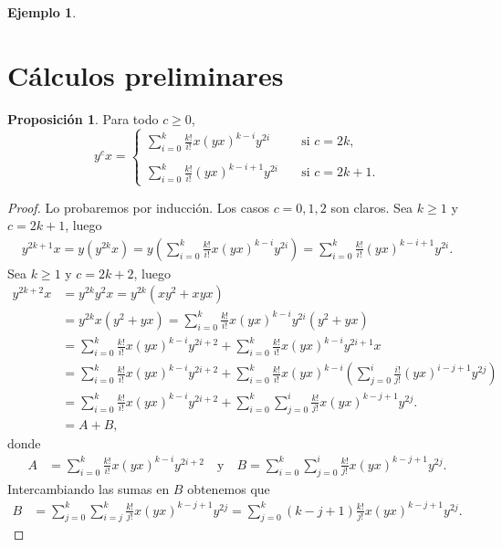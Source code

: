 \documentclass[a4paper,oneside,fleqn,11pt]{report}
\theoremstyle{definition}
\theoremstyle{definition}
\newtheorem{example}{Ejemplo}[section]
\newtheorem{prop}{Proposición}
\numberwithin{prop}{subsection}
\begin{document}
\begin{example}


\section{Cálculos preliminares}

\begin{prop}
\label{cp_conmutatividad}
Para todo $c \geq 0$,
\[
	y^cx = \left\{\begin{array}{cc}
			\sum_{i = 0}^k\frac{k!}{i!}x(yx)^{k - i}y^{2i} \quad&\text{si } c = 2k,\\
			&\\
			\sum_{i = 0}^k \frac{k!}{i!}(yx)^{k - i + 1}y^{2i} \quad&\text{si } c = 2k + 1.
	\end{array}\right.
\]
\end{prop}
\begin{proof}
Lo probaremos por inducción. Los casos $c = 0, 1, 2$ son claros. 
Sea $k \geq 1$ y $c = 2k + 1$, luego
\begin{align*}
	y^{2k + 1}x = y(y^{2k}x) = y(\sum_{i = 0}^k \frac{k!}{i!}x(yx)^{k - i}y^{2i}) = \sum_{i = 0}^k \frac{k!}{i!}(yx)^{k - i + 1}y^{2i}.
\end{align*}
Sea $k \geq 1$ y $c = 2k + 2$, luego
\begin{align*}
	y^{2k + 2}x &= y^{2k}y^2x = y^{2k}(xy^2 + xyx) \\ 
	&= y^{2k}x(y^2 + yx) = \sum_{i = 0}^k \frac{k!}{i!}x(yx)^{k - i}y^{2i}(y^2 + yx) \\
	&= \sum_{i = 0}^k \frac{k!}{i!}x(yx)^{k - i}y^{2i + 2} + \sum_{i = 0}^k\frac{k!}{i!} x(yx)^{k - i}y^{2i + 1}x \\
	&= \sum_{i = 0}^k \frac{k!}{i!}x(yx)^{k - i}y^{2i + 2}
		+ \sum_{i = 0}^k\frac{k!}{i!} x(yx)^{k - i}\left(\sum_{j = 0}^i\frac{i!}{j!}(yx)^{i - j + 1}y^{2j}\right) \\
	&= \sum_{i = 0}^k \frac{k!}{i!}x(yx)^{k - i}y^{2i + 2}
		+ \sum_{i = 0}^k \sum_{j = 0}^i \frac{k!}{j!} x(yx)^{k - j + 1}y^{2j}. \\
	&= A + B,
\end{align*}
donde
\begin{align*}
	A &= \sum_{i = 0}^k \frac{k!}{i!}x(yx)^{k - i}y^{2i + 2} \quad\text{y}\quad B = \sum_{i = 0}^k \sum_{j = 0}^i \frac{k!}{j!} x(yx)^{k - j + 1}y^{2j}.
\end{align*}
Intercambiando las sumas en $B$ obtenemos que
\begin{align*}
	B &=  \sum_{j = 0}^k \sum_{i = j}^k \frac{k!}{j!} x(yx)^{k - j + 1}y^{2j}  = \sum_{j = 0}^k (k - j + 1)\frac{k!}{j!} x(yx)^{k - j + 1}y^{2j}.

\end{align*}
\end{proof}
\end{example}
\end{document}

